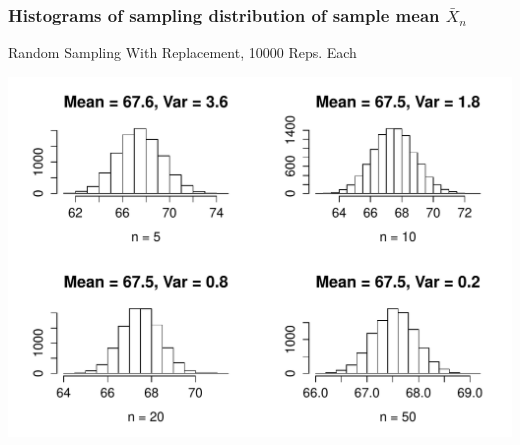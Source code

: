 \documentclass[handout]{beamer}
\begin{document}
\begin{frame}
\frametitle{Histograms of sampling distribution of sample mean $\bar{X}_n$}
\alert{Random Sampling With Replacement, 10000 Reps. Each}
\begin{center}
\includegraphics[scale = 0.55]{./images/height_samples}
\end{center}
\end{frame}
\end{document}

